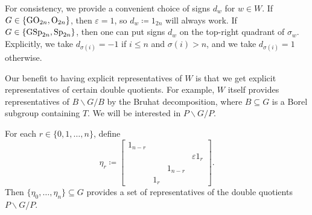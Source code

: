 \begin{remark}
    For consistency, we provide a convenient choice of signs $d_w$ for $w\in W$. If $G\in\{\mathrm{GO}_{2n},\mathrm{O}_{2n}\}$, then $\varepsilon=1$, so $d_w\coloneqq1_{2n}$ will always work. If $G\in\{\mathrm{GSp}_{2n},\mathrm{Sp}_{2n}\}$, then one can put signs $d_w$ on the top-right quadrant of $\sigma_w$. Explicitly, we take $d_{\sigma(i)}=-1$ if $i\le n$ and $\sigma(i)>n$, and we take $d_{\sigma(i)}=1$ otherwise.
\end{remark}
Our benefit to having explicit representatives of $W$ is that we get explicit representatives of certain double quotients. For example, $W$ itself provides representatives of $B\backslash G/B$ by the Bruhat decomposition, where $B\subseteq G$ is a Borel subgroup containing $T$. We will be interested in $P\backslash G/P$.
\begin{lemma} \label{lem:compute-pgp}
    For each $r\in\{0,1,\ldots,n\}$, define
    \[\eta_r\coloneqq\begin{bmatrix}
        1_{n-r} \\ &&& \varepsilon1_r \\
        && 1_{n-r} \\
        & 1_r
    \end{bmatrix}.\]
    Then $\{\eta_0,\ldots,\eta_n\}\subseteq G$ provides a set of representatives of the double quotients $P\backslash G/P$.
\end{lemma}
